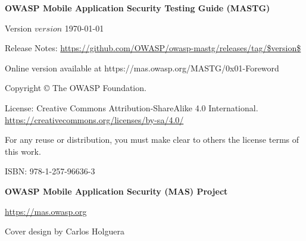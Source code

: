\thispagestyle{empty} %

\textbf{OWASP Mobile Application Security Testing Guide (MASTG)}

Version $version$ \today

Release Notes: \url{https://github.com/OWASP/owasp-mastg/releases/tag/$version$}

Online version available at https://mas.owasp.org/MASTG/0x01-Foreword

Copyright © The OWASP Foundation. 

\newline

License: Creative Commons Attribution-ShareAlike 4.0 International.
\url{https://creativecommons.org/licenses/by-sa/4.0/}

For any reuse or distribution, you must make clear to others the license terms of this work.

\newline

ISBN: 978-1-257-96636-3 

\newline

\textbf{OWASP Mobile Application Security (MAS) Project}

\url{https://mas.owasp.org}

\newline
\newline

Cover design by Carlos Holguera